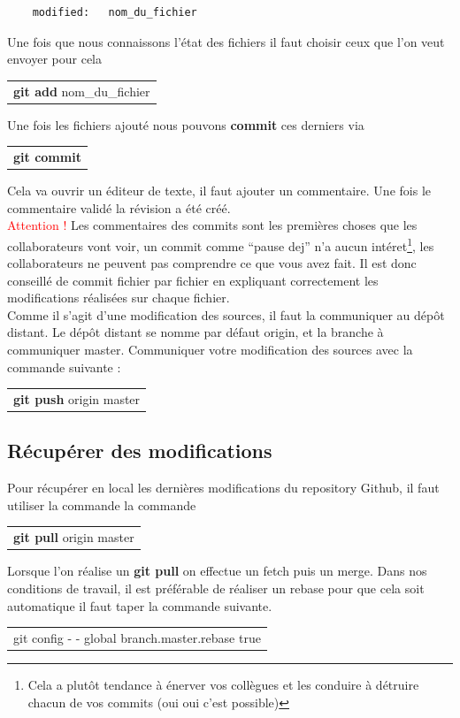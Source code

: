 \documentclass[a4paper,10pt]{article}
\begin{document}
\begin{spacing}{1.5}
\begin{lstlisting}
    modified:   nom_du_fichier
\end{lstlisting}
Une fois que nous connaissons l'état des fichiers il faut choisir ceux que l'on veut envoyer
pour cela
\begin{center}
  \begin{tabular}{c}
    \rowcolor{lightgray!50!white}
      \textbf{git add} nom\_du\_fichier
  \end{tabular}
\end{center}
Une fois les fichiers ajouté nous pouvons \textbf{commit} ces derniers via
\begin{center}
  \begin{tabular}{c}
    \rowcolor{lightgray!50!white}
      \textbf{git commit}
  \end{tabular}
\end{center}
Cela va ouvrir un éditeur de texte, il faut ajouter un commentaire. Une fois le
commentaire validé la révision a été créé.\\ \textcolor{red}{Attention !} Les
commentaires des commits sont les premières choses que les collaborateurs vont
voir, un commit comme ``pause dej'' n'a aucun intéret\footnote{Cela a plutôt
  tendance à énerver vos collègues et les conduire à détruire chacun de vos
  commits (oui oui c'est possible)}, les collaborateurs ne peuvent pas
comprendre ce que vous avez fait. Il est donc conseillé de commit fichier par
fichier en expliquant correctement les modifications réalisées sur chaque
fichier.\\
Comme il s'agit d'une modification des sources, il faut la communiquer au dépôt
distant. Le dépôt distant se nomme par défaut origin, et la branche à
communiquer master. Communiquer votre modification des sources avec la commande
suivante :
\begin{center}
  \begin{tabular}{c}
    \rowcolor{lightgray!50!white}
      \textbf{git push} origin master
  \end{tabular}
\end{center}

\newpage
\subsection*{Récupérer des modifications}
Pour récupérer en local les dernières modifications du repository Github, il
faut utiliser la commande la commande
\begin{center}
  \begin{tabular}{c}
    \rowcolor{lightgray!50!white}
      \textbf{git pull} origin master
  \end{tabular}
\end{center}
Lorsque l'on réalise un \textbf{git pull} on effectue un fetch puis
un merge. Dans nos conditions de travail, il est préférable de
réaliser un rebase pour que cela soit automatique il faut taper la commande
suivante.
\begin{center}
  \begin{tabular}{c}
    \rowcolor{lightgray!50!white}
      git config - - global branch.master.rebase true
  \end{tabular}
\end{center}


\end{spacing}
\end{document}
